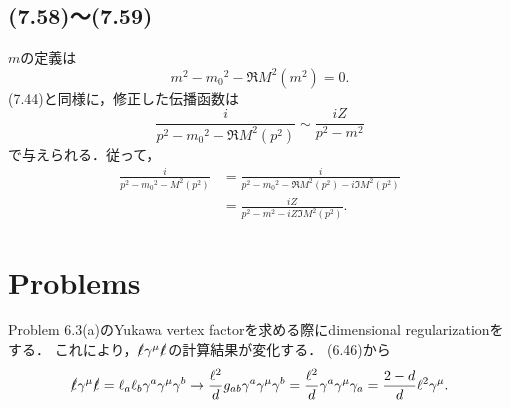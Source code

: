 \subsection{(7.58)～(7.59)}
$m$の定義は
\[ m^2 - m_0{}^2 - \Re M^2(m^2) = 0 . \]
(7.44)と同様に，修正した伝播函数は
\[ \frac{i}{p^2 - m_0{}^2 - \Re M^2(p^2)} \sim \frac{iZ}{p^2 - m^2} \]
で与えられる．従って，
\begin{align*}
  \frac{i}{p^2 - m_0{}^2 - M^2(p^2)} &= \frac{i}{p^2 - m_0{}^2 - \Re M^2(p^2) - i \Im M^2(p^2)} \\
  &= \frac{iZ}{p^2 - m^2 - iZ \Im M^2(p^2)} .
\end{align*}

\section*{Problems}
Problem 6.3(a)のYukawa vertex factorを求める際にdimensional regularizationをする．
これにより，$\slashed\ell \gamma^\mu \slashed\ell$の計算結果が変化する．
(6.46)から
\[
  \slashed\ell \gamma^\mu \slashed\ell = \ell_a \ell_b \gamma^a \gamma^\mu \gamma^b
  \to \frac{\ell^2}{d} g_{ab} \gamma^a \gamma^\mu \gamma^b
  = \frac{\ell^2}{d} \gamma^a \gamma^\mu \gamma_a
  = \frac{2 - d}{d} \ell^2 \gamma^\mu .
\]
